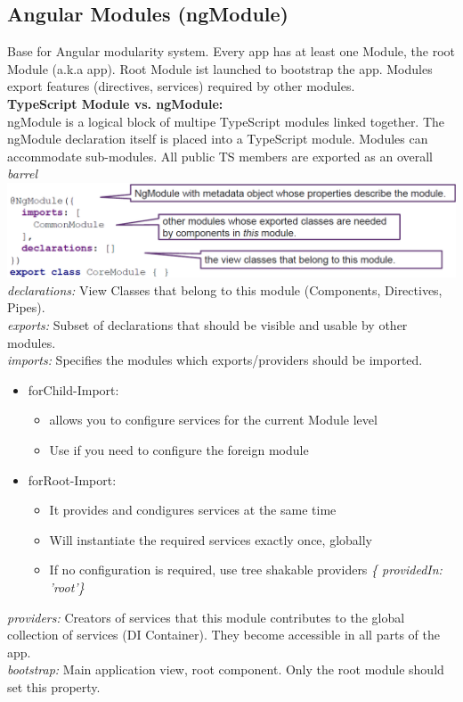 \subsection{Angular Modules (ngModule)}
Base for Angular modularity system. Every app has at least one Module, the root Module (a.k.a app).
Root Module ist launched to bootstrap the app.
Modules export features (directives, services) required by other modules.\\
\textbf{TypeScript Module vs. ngModule:}\\
ngModule is a logical block of multipe TypeScript modules linked together.
The ngModule declaration itself is placed into a TypeScript module.
Modules can accommodate sub-modules. All public TS members are exported as an overall \textit{barrel}
\includegraphics[width=\linewidth]{img/angular_module_declaration.png}
\textit{declarations:} View Classes that belong to this module (Components, Directives, Pipes).\\
\textit{exports:} Subset of declarations that should be visible and usable by other modules.\\
\textit{imports:} Specifies the modules which exports/providers should be imported.
\begin{itemize}
    \item forChild-Import:
    \begin{itemize}
        \item allows you to configure services for the current Module level
        \item Use if you need to configure the foreign module
    \end{itemize}
    \item forRoot-Import: 
    \begin{itemize}
        \item It provides and condigures services at the same time
        \item Will instantiate the required services exactly once, globally
        \item If no configuration is required, use tree shakable providers \textit{\{ providedIn: 'root'\}}
    \end{itemize}
\end{itemize}
\textit{providers:} Creators of services that this module contributes to the global collection of services (DI Container).
They become accessible in all parts of the app.\\
\textit{bootstrap:} Main application view, root component.
Only the root module should set this property.

